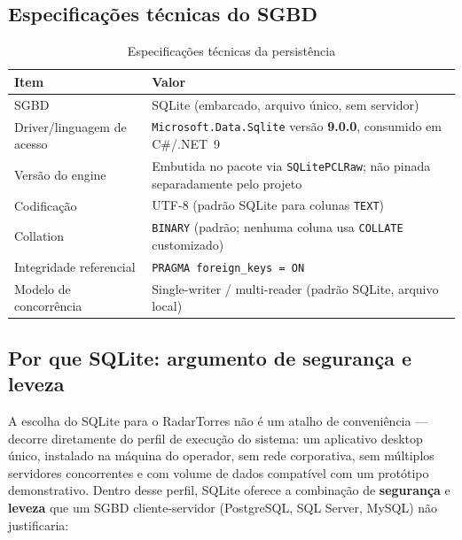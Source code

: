 \subsection{Especificações técnicas do SGBD}

\begin{table}[htbp]
  \centering
  \caption{Especificações técnicas da persistência}
  \label{tab:specs}
  \small
  \renewcommand{\arraystretch}{1.25}
  \begin{tabular}{p{3.8cm}p{9.4cm}}
    \hline
    \textbf{Item} & \textbf{Valor} \\
    \hline
    SGBD & SQLite (embarcado, arquivo único, sem servidor) \\
    Driver/linguagem de acesso & \texttt{Microsoft.Data.Sqlite} versão \textbf{9.0.0}, consumido em
    C\#/.NET~9 \\
    Versão do engine & Embutida no pacote via \texttt{SQLitePCLRaw}; não pinada separadamente pelo
    projeto \\
    Codificação & UTF-8 (padrão SQLite para colunas \texttt{TEXT}) \\
    Collation & \texttt{BINARY} (padrão; nenhuma coluna usa \texttt{COLLATE} customizado) \\
    Integridade referencial & \texttt{PRAGMA foreign\_keys = ON} \\
    Modelo de concorrência & Single-writer / multi-reader (padrão SQLite, arquivo local) \\
    \hline
  \end{tabular}
\end{table}

\subsection{Por que SQLite: argumento de segurança e leveza}
\label{sec:justificativa}

A escolha do SQLite para o RadarTorres não é um atalho de conveniência — decorre diretamente do
perfil de execução do sistema: um aplicativo desktop único, instalado na máquina do operador,
sem rede corporativa, sem múltiplos servidores concorrentes e com volume de dados compatível com
um protótipo demonstrativo. Dentro desse perfil, SQLite oferece a combinação de
\textbf{segurança} e \textbf{leveza} que um SGBD cliente-servidor (PostgreSQL, SQL Server, MySQL)
não justificaria:

